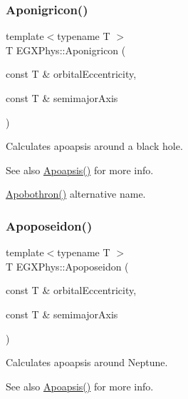\subsubsection{\texorpdfstring{Aponigricon()}{Aponigricon()}}
{\footnotesize\ttfamily template$<$typename T $>$ \\
T E\+G\+X\+Phys\+::\+Aponigricon (\begin{DoxyParamCaption}\item[{const T \&}]{orbital\+Eccentricity,  }\item[{const T \&}]{semimajor\+Axis }\end{DoxyParamCaption})}



Calculates apoapsis around a black hole. 

\begin{DoxySeeAlso}{See also}
\hyperlink{group___e_g_x_phys-_apoapsis_gaf962e650bf84a568458e8eb39b1c61ba}{Apoapsis()} for more info. 

\hyperlink{group___e_g_x_phys-_apoapsis_ga6fe084b9e69f47a5032b05aa8f6bf7ad}{Apobothron()} alternative name. 
\end{DoxySeeAlso}
\mbox{\label{group___e_g_x_phys-_apoapsis_ga89679654fff13176e989536163a27f9d}} 
\subsubsection{\texorpdfstring{Apoposeidon()}{Apoposeidon()}}
{\footnotesize\ttfamily template$<$typename T $>$ \\
T E\+G\+X\+Phys\+::\+Apoposeidon (\begin{DoxyParamCaption}\item[{const T \&}]{orbital\+Eccentricity,  }\item[{const T \&}]{semimajor\+Axis }\end{DoxyParamCaption})}



Calculates apoapsis around Neptune. 

\begin{DoxySeeAlso}{See also}
\hyperlink{group___e_g_x_phys-_apoapsis_gaf962e650bf84a568458e8eb39b1c61ba}{Apoapsis()} for more info. 
\end{DoxySeeAlso}
\mbox{\label{group___e_g_x_phys-_apoapsis_gac157adc20a88c8616e4822eb819f9016}} 
